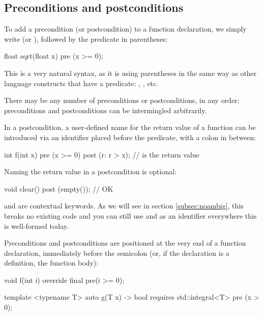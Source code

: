 
\subsection{Preconditions and postconditions}

To add a precondition (or postcondition) to a function declaration, we simply write  (or ), followed by the predicate in parentheses:

\begin{codeblock}
float sqrt(float x)
  pre (x >= 0);
\end{codeblock}

This is a very natural syntax, as it is using parentheses in the same way as other language constructs that have a predicate: , , etc.

There may be any number of preconditions or postconditions, in any order; preconditions and postconditions can be intermingled arbitrarily.

In a postcondition, a user-defined name for the return value of a function can be introduced via an identifier placed before the predicate, with a colon in between:

\begin{codeblock}
int f(int x)
  pre (x >= 0)
  post (r: r > x);   //  is the return value
\end{codeblock}

Naming the return value in a postcondition is optional:

\begin{codeblock}
void clear()
  post (empty());   // OK
\end{codeblock}

 and  are contextual keywords. As we will see in section \ref{subsec:noambig}, this breaks no existing code and you can still use  and  as an identifier everywhere this is well-formed today.

Preconditions and postconditions are positioned at the very end of a function declaration, immediately before the semicolon (or, if the declaration is a definition, the function body):

\begin{codeblock}
void f(int i) override final
  pre(i >= 0);
  
template <typename T>
auto g(T x) -> bool
  requires std::integral<T>
  pre (x > 0);
\end{codeblock}

